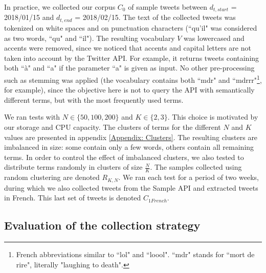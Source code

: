 In practice, we collected our corpus $C_0$ of sample tweets between $d_{t,start} $ = 2018/01/15 and $d_{t,end}$ = 2018/02/15. The text of the collected tweets was tokenized on white spaces and on punctuation characters (``qu'il" was considered as two words, ``qu" and ``il"). The resulting vocabulary $V$ was lowercased and accents were removed, since we noticed that accents and capital letters are not taken into account by the Twitter API. For example, it returns tweets containing both ``à" and ``a" if the parameter ``a" is given as input. No other pre-processing such as stemming was applied (the vocabulary contains both ``mdr" and ``mdrrr"\footnote{French abbreviations similar to ``lol" and ``loool". ``mdr" stands for ``mort de rire", literally "laughing to death".}, for example), since the objective here is not to query the API with semantically different terms, but with the most frequently used terms.


 We ran tests with $N \in \{50, 100, 200\}$ and $K \in \{2,3\}$. This choice is motivated by our storage and CPU capacity. The clusters of terms for the different $N$ and $K$ values are presented in appendix \ref{Appendix: Clusters}. The resulting clusters are imbalanced in size: some contain only a few words, others contain all remaining terms. In order to control the effect of imbalanced clusters, we also tested to distribute terms randomly in clusters of size $\frac{N}{K}$. The samples collected using random clustering are denoted $R_{K,N}$. We ran each test for a period of two weeks, during which we also collected tweets from the Sample API and extracted tweets in French. This last set of tweets is denoted $C_{1 French}$.
			
			\subsection{Evaluation of the collection strategy \label{SubSec: evaluation_of_collection}}
			
